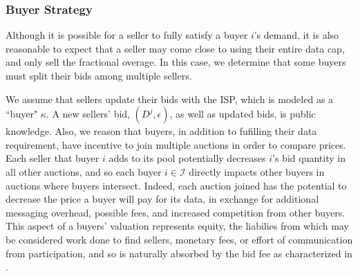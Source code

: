 \documentclass[12pt]{article}
\theoremstyle{definition}
\newcommand{\mcI}{\mathcal{I}}
\begin{document}
\begin{multicols}{2}
\subsubsection{Buyer Strategy}

 
Although it is possible for a seller to fully satisfy a buyer $i$'s demand, it
is also reasonable to expect that a seller may come close to using their
entire data cap, and only sell the fractional overage. In this case, we
determine that some buyers must split their bids among multiple sellers. 
 
We assume that sellers update their bids with the ISP, which is modeled as a
``buyer" $\kappa$. 
A new sellers' bid, $(D^j, \epsilon)$, as well as updated bids, is public
knowledge. Also, we reason that buyers,
in addition to fufilling their data requirement, have incentive to join
multiple auctions in order to compare prices.
Each seller that buyer $i$ adds
to its pool potentially decreases $i$'s bid quantity in all other auctions, and
so each buyer $i\in\mcI$ directly impacts other buyers in auctions where buyers intersect.
Indeed, each auction joined has the potential to decrease the price a buyer
will pay for its data, in exchange for additional messaging overhead, possible
fees, and increased competition from other buyers. This aspect of
a buyers' valuation represents equity, the liabilies from which may be considered work done to find
sellers, monetary fees, or effort of communication from participation, and so
is naturally absorbed by the bid fee as characterized in \cite{semret}.


\end{multicols}
\end{document}
